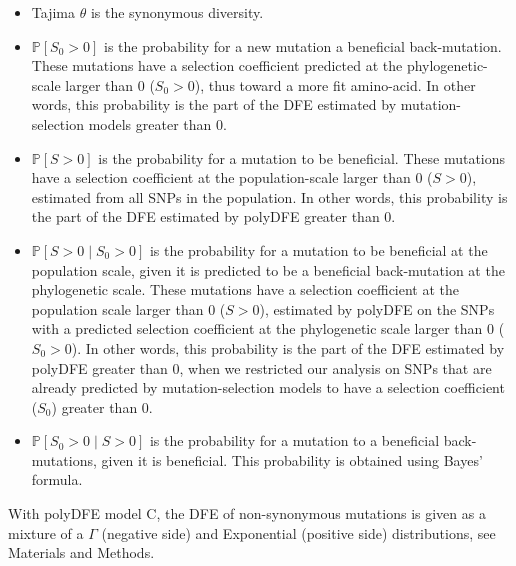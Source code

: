 \documentclass{article}
\newcommand{\Sphy}{S_{0}}
\newcommand{\given}{\mid}
\newcommand{\Spop}{S}
\begin{document}
    \begin{itemize}
        \item Tajima $\theta$ is the synonymous diversity.
        \item $\mathbb{P} [ \Sphy > 0 ]$ is the probability for a new mutation a beneficial back-mutation.
        These mutations have a selection coefficient predicted at the phylogenetic-scale larger than 0 ($\Sphy > 0$), thus toward a more fit amino-acid.
        In other words, this probability is the part of the DFE estimated by mutation-selection models greater than 0.
        \item $\mathbb{P} [ \Spop > 0 ]$ is the probability for a mutation to be beneficial.
        These mutations have a selection coefficient at the population-scale larger than 0 ($\Spop > 0$), estimated from all SNPs in the population.
        In other words, this probability is the part of the DFE estimated by polyDFE greater than 0.
        \item $\mathbb{P} [ \Spop > 0 \given \Sphy > 0]$ is the probability for a mutation to be beneficial at the population scale, given it is predicted to be a beneficial back-mutation at the phylogenetic scale.
        These mutations have a selection coefficient at the population scale larger than 0 ($\Spop > 0$), estimated by polyDFE on the SNPs with a predicted selection coefficient at the phylogenetic scale larger than 0 ($\Sphy > 0$).
        In other words, this probability is the part of the DFE estimated by polyDFE greater than 0, when we restricted our analysis on SNPs that are already predicted by mutation-selection models to have a selection coefficient ($\Sphy$) greater than 0.
        \item $\mathbb{P} [ \Sphy > 0 \given \Spop > 0]$ is the probability for a mutation to a beneficial back-mutations, given it is beneficial.
        This probability is obtained using Bayes' formula.
    \end{itemize}
    With polyDFE model C, the DFE of non-synonymous mutations is given as a mixture of a $\Gamma$ (negative side) and Exponential (positive side) distributions, see Materials and Methods.
\end{document}
